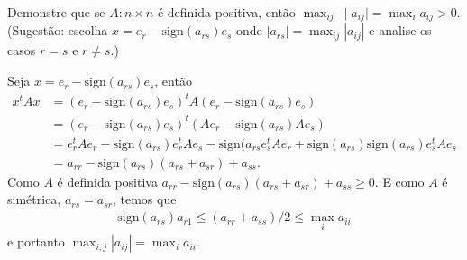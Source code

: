 \documentclass[a4paper,12pt, leqno, answers]{exam}
\begin{document}
\begin{questions}
    \question Demonstre que se $A : n \times n$ \'{e} definida positiva, ent\~{a}o $\max_{ij} \| a_{ij} | = \max_i a_{ij} > 0$. (Sugest\~{a}o: escolha $x = e_r - \text{sign}(a_{rs}) e_s$ onde $| a_{rs} | = \max_{ij} | a_{ij} |$ e analise os casos $r = s$ e $r \neq s$.)
    \begin{solution}
        Seja $x = e_r - \text{sign}(a_{rs}) e_s$, ent\~{a}o
        \begin{align*}
            x^t A x &= \left( e_r - \text{sign}(a_{rs}) e_s \right)^t A \left( e_r - \text{sign}(a_{rs}) e_s \right) \\
            &= \left( e_r - \text{sign}(a_{rs}) e_s \right)^t \left( A e_r - \text{sign}(a_{rs}) A e_s \right) \\
            &= e_r^t A e_r - \text{sign}(a_{rs}) e_r^t A e_s - \text{sign}(a_{rs} e_s^t A e_r + \text{sign}(a_{rs}) \text{sign}(a_{rs}) e_s^t A e_s \\
            &= a_{rr} - \text{sign}(a_{rs}) \left( a_{rs} + a_{sr} \right) + a_{ss}.
        \end{align*}
        Como $A$ \'{e} definida positiva $a_{rr} - \text{sign}(a_{rs}) \left( a_{rs} + a_{sr} \right) + a_{ss} \geq 0$. E como $A$ \'{e} sim\'{e}trica, $a_{rs} = a_{sr}$, temos que
        \begin{align*}
            \text{sign}(a_{rs}) a_{r1} \leq \left( a_{rr} + a_{ss} \right) / 2 \leq \max_i a_{ii}
        \end{align*}
        e portanto $\max_{i,j} | a_{ij} | = \max_i a_{ii}$.
    \end{solution}


\end{questions}
\end{document}
